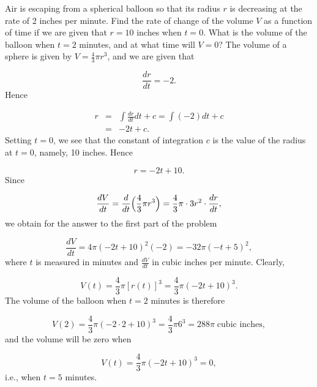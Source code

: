 \begin{example}
Air is escaping from a spherical balloon so that its radius $r$ is decreasing at the rate of 2 inches per minute. Find the rate of change of the volume $V$ as a function of time if we are given that $r = 10$ inches when $t = 0$. What is the volume of the balloon when $t = 2$ minutes, and at what time will $V = 0$? The volume of a sphere is given by $V = \frac{4}{3} \pi r^3$, and we are given that

$$
\frac{dr}{dt} = -2.
$$
\noindent Hence 

\begin{eqnarray*}
r &=& \int \frac{dr}{dt} dt + c = \int (-2) dt + c \\
  &=&  -2t + c.
\end{eqnarray*}
\noindent Setting $t = 0$, we see that the constant of integration $c$ is the value of the radius at $t = 0$, namely, 10 inches. Hence

$$
r = - 2t + 10.
$$
\noindent Since
 
$$
\frac{dV}{dt} = \frac{d}{dt} \Bigl( \frac{4}{3} \pi r^3 \Bigr) = \frac{4}{3} \pi \cdot 3r^2 \cdot \frac{dr}{dt},
$$
\noindent we obtain for the answer to the first part of the problem

$$
\frac{dV}{dt} = 4 \pi (- 2t + 10)^2 (- 2) = - 32 \pi (-t + 5)^2,
$$
\noindent where $t$ is measured in minutes and $\frac{dV}{dt}$ in cubic inches per minute. Clearly,

$$
V(t) = \frac{4}{3} \pi [r(t)]^3 = \frac{4}{3} \pi (- 2t + 10)^3.
$$
\noindent The volume of the balloon when $t = 2$ minutes is therefore

$$
V(2) = \frac{4}{3} \pi (- 2 \cdot 2 + 10)^3 = \frac{4}{3} \pi 6^3 = 288 \pi \;\mbox{cubic inches}, 
$$
\noindent and the volume will be zero when

$$
V(t) = \frac{4}{3}\pi (- 2t + 10)^3 = 0, 
$$
\noindent i.e., when $t = 5$ minutes.
\end{example}
 

